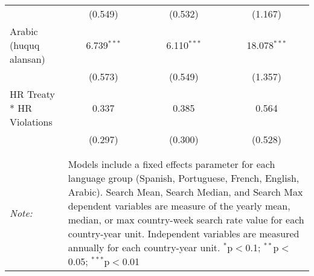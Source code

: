 \begin{table}[!htbp]
\begin{tabular}{@{\extracolsep{5pt}}lccc}
  & (0.549) & (0.532) & (1.167) \\ 
  Arabic (huquq alansan) & 6.739$^{***}$ & 6.110$^{***}$ & 18.078$^{***}$ \\ 
  & (0.573) & (0.549) & (1.357) \\ 
  HR Treaty * HR Violations & 0.337 & 0.385 & 0.564 \\ 
  & (0.297) & (0.300) & (0.528) \\ 
 \hline \\[-1.8ex] 
\hline 
\hline \\[-1.8ex] 
\textit{Note:}  & \multicolumn{3}{l}{\parbox[t]{8cm}{Models include a fixed effects parameter for each language group (Spanish, Portuguese, French, English, Arabic). Search Mean, Search Median, and Search Max dependent variables are measure of the yearly mean, median, or max country-week search rate value for each country-year unit. Independent variables are measured annually for each country-year unit. $^{*}$p$<$0.1; $^{**}$p$<$0.05; $^{***}$p$<$0.01}} \\ 
\end{tabular} 
\end{table} 
